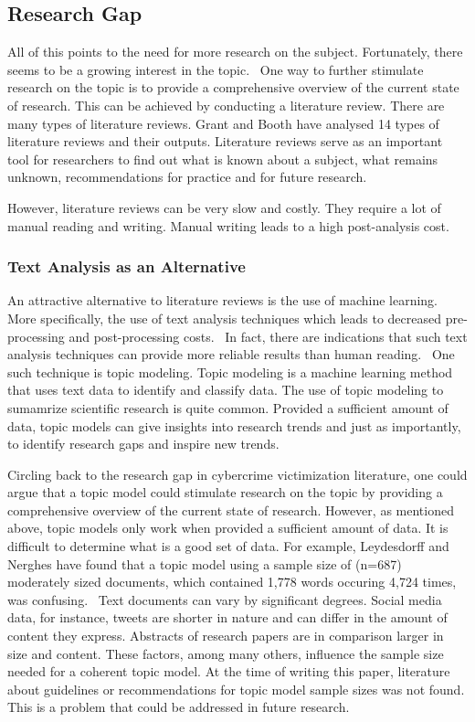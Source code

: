 \documentclass[12pt,english,titlepage,a4paper]{article}
\begin{document}
\subsection{Research Gap}

All of this points to the need for more research on the subject. Fortunately, there seems to be a growing interest in the topic.~\citep{horesearch} One way to further stimulate research on the topic is to provide a comprehensive overview of the current state of research. This can be achieved by conducting a literature review. There are many types of literature reviews. Grant and Booth have analysed 14 types of literature reviews and their outputs. Literature reviews serve as an important tool for researchers to find out what is known about a subject, what remains unknown, recommendations for practice and for future research.~\citep{grant2009typology}

However, literature reviews can be very slow and costly. They require a lot of manual reading and writing. Manual writing leads to a high post-analysis cost.~\citep{quinn2010analyze}

\subsubsection*{Text Analysis as an Alternative}

An attractive alternative to literature reviews is the use of machine learning. More specifically, the use of text analysis techniques which leads to decreased pre-processing and post-processing costs.~\citep{quinn2010analyze} In fact, there are indications that such text analysis techniques can provide more reliable results than human reading.~\citep{king2003automated}\citep{quinn2010analyze} One such technique is topic modeling. Topic modeling is a machine learning method that uses text data to identify and classify data. The use of topic modeling to sumamrize scientific research is quite common. Provided a sufficient amount of data, topic models can give insights into research trends and just as importantly, to identify research gaps and inspire new trends.~\citep{luiz2019trait}

Circling back to the research gap in cybercrime victimization literature, one could argue that a topic model could stimulate research on the topic by providing a comprehensive overview of the current state of research. However, as mentioned above, topic models only work when provided a sufficient amount of data. It is difficult to determine what is a good set of data. For example, Leydesdorff and Nerghes have found that a topic model using a sample size of (n=687) moderately sized documents, which contained 1,778 words occuring 4,724 times, was confusing.~\citep{leydesdorff2017co} Text documents can vary by significant degrees. Social media data, for instance, tweets are shorter in nature and can differ in the amount of content they express. Abstracts of research papers are in comparison larger in size and content. These factors, among many others, influence the sample size needed for a coherent topic model. At the time of writing this paper, literature about guidelines or recommendations for topic model sample sizes was not found. This is a problem that could be addressed in future research.
\end{document}
